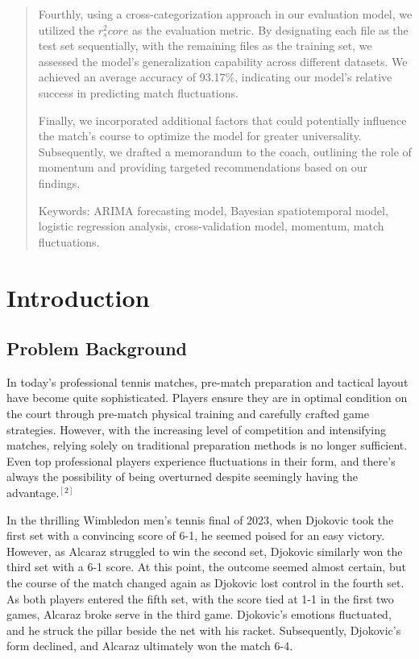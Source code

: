 \documentclass[12pt]{article}
\begin{document}
\begin{abstract}
Fourthly, using a cross-categorization approach in our evaluation model, we utilized the $r^2_score$ as the evaluation metric. By designating each file as the test set sequentially, with the remaining files as the training set, we assessed the model's generalization capability across different datasets. We achieved an average accuracy of 93.17\%, indicating our model's relative success in predicting match fluctuations.

Finally, we incorporated additional factors that could potentially influence the match's course to optimize the model for greater universality. Subsequently, we drafted a memorandum to the coach, outlining the role of momentum and providing targeted recommendations based on our findings.

    Keywords: ARIMA forecasting model, Bayesian spatiotemporal model, logistic regression analysis, cross-validation model, momentum, match fluctuations.

\end{abstract}

\maketitle  %
\tableofcontents  %


\section{Introduction}
\subsection{Problem Background}

In today's professional tennis matches, pre-match preparation and tactical layout have become quite sophisticated. Players ensure they are in optimal condition on the court through pre-match physical training and carefully crafted game strategies. However, with the increasing level of competition and intensifying matches, relying solely on traditional preparation methods is no longer sufficient. Even top professional players experience fluctuations in their form, and there's always the possibility of being overturned despite seemingly having the advantage.$^{[2]} $

In the thrilling Wimbledon men's tennis final of 2023, when Djokovic took the first set with a convincing score of 6-1, he seemed poised for an easy victory. However, as Alcaraz struggled to win the second set, Djokovic similarly won the third set with a 6-1 score. At this point, the outcome seemed almost certain, but the course of the match changed again as Djokovic lost control in the fourth set. As both players entered the fifth set, with the score tied at 1-1 in the first two games, Alcaraz broke serve in the third game. Djokovic's emotions fluctuated, and he struck the pillar beside the net with his racket. Subsequently, Djokovic's form declined, and Alcaraz ultimately won the match 6-4.
\end{document}
